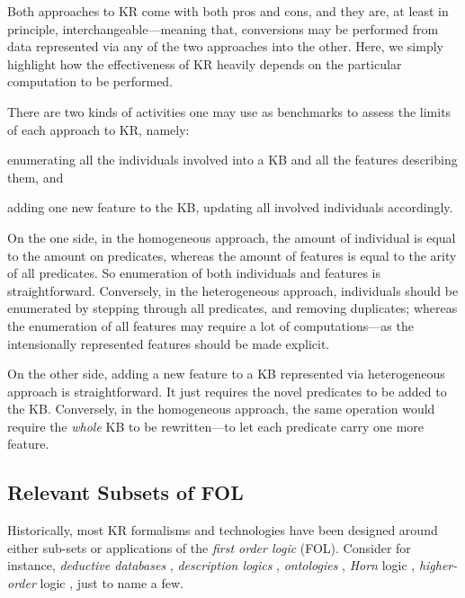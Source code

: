 \documentclass[12pt,a4paper,openright,twoside]{book}
\begin{document}
Both approaches to KR come with both pros and cons, and they are, at least in principle, interchangeable---meaning that, conversions may be performed from data represented via any of the two approaches into the other.
%
Here, we simply highlight how the effectiveness of KR heavily depends on the particular computation to be performed.

There are two kinds of activities one may use as benchmarks to assess the limits of each approach to KR, namely:
%
\begin{inlinelist}
    \item\label{item:enumerate-features} enumerating all the individuals involved into a KB and all the features describing them, and
    \item\label{item:add-features} adding one new feature to the KB, updating all involved individuals accordingly. 
\end{inlinelist}  

On the one side, in the homogeneous approach, the amount of individual is equal to the amount on predicates, whereas the amount of features is equal to the arity of all predicates.
%
So enumeration of both individuals and features is straightforward.
%
Conversely, in the heterogeneous approach, individuals should be enumerated by stepping through all predicates, and removing duplicates; whereas the enumeration of all features may require a lot of computations---as the intensionally represented features should be made explicit. 

On the other side, adding a new feature to a KB represented via heterogeneous approach is straightforward.
%
It just requires the novel predicates to be added to the KB.
%
Conversely, in the homogeneous approach, the same operation would require the \emph{whole} KB to be rewritten---to let each predicate carry one more feature.

\subsection{Relevant Subsets of FOL}

Historically, most KR formalisms and technologies have been designed around either sub-sets or applications of the \emph{first order logic} (FOL).
%
Consider for instance, \emph{deductive databases} \cite{green1968}, \emph{description logics} \cite{baader2002}, \emph{ontologies} \cite{cimiano2006-ontologies}, \emph{Horn} logic \missingref, \emph{higher-order} logic \missingref, just to name a few.
\end{document}
